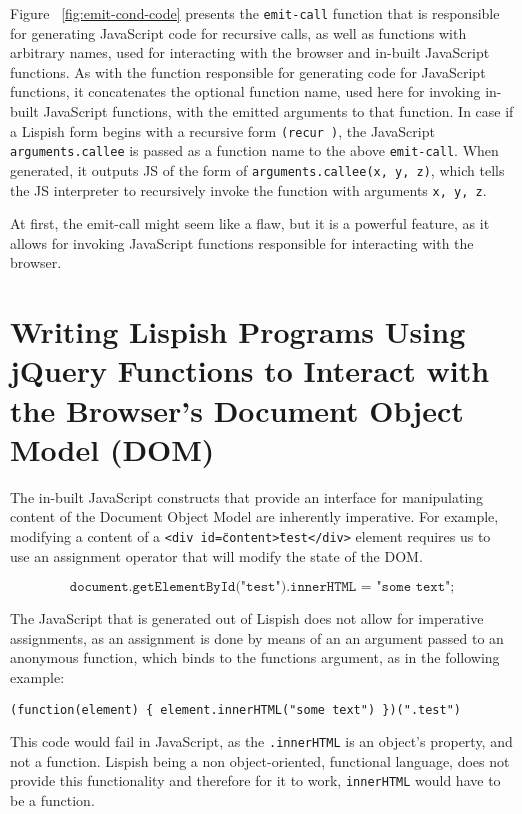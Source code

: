 

Figure ~\ref{fig:emit-cond-code} presents the \texttt{emit-call} function that is responsible for generating JavaScript code for recursive calls, as well as functions with arbitrary names, used for interacting with the browser and in-built JavaScript functions. 
As with the function responsible for generating code for JavaScript functions, it concatenates the optional function name, used here for invoking in-built JavaScript functions, with the emitted arguments to that function.
In case if a Lispish form begins with a recursive form \texttt{(recur )}, the JavaScript \texttt{arguments.callee} is passed as a function name to the above \texttt{emit-call}.
When generated, it outputs JS of the form of \texttt{arguments.callee(x, y, z)}, which tells the JS interpreter to recursively invoke the function with arguments \texttt{x, y, z}.

At first, the emit-call might seem like a flaw, but it is a powerful feature, as it allows for invoking JavaScript functions responsible for interacting with the browser. 

\section{Writing Lispish Programs Using jQuery Functions to Interact with the Browser's Document Object Model (DOM)}\label{DOM}
The in-built JavaScript constructs that provide an interface for manipulating content of the Document Object Model are inherently imperative.
For example, modifying a content of a \texttt{<div id=\"content\">test</div>} element requires us to use an assignment operator that will modify the state of the DOM. 

$$ \texttt{document.getElementById("test").innerHTML = "some text";} $$


The JavaScript that is generated out of Lispish does not allow for imperative assignments, as an assignment is done by means of an an argument passed to an anonymous function, which binds to the functions argument, as in the following 
example:  

\begin{verbatim}
(function(element) { element.innerHTML("some text") })(".test")
\end{verbatim}


This code would fail in JavaScript, as the \texttt{.innerHTML} is an object's property, and not a function. Lispish being a non object-oriented, functional language, does not provide this functionality and therefore for it to work, \texttt{innerHTML} would have to be a function.

